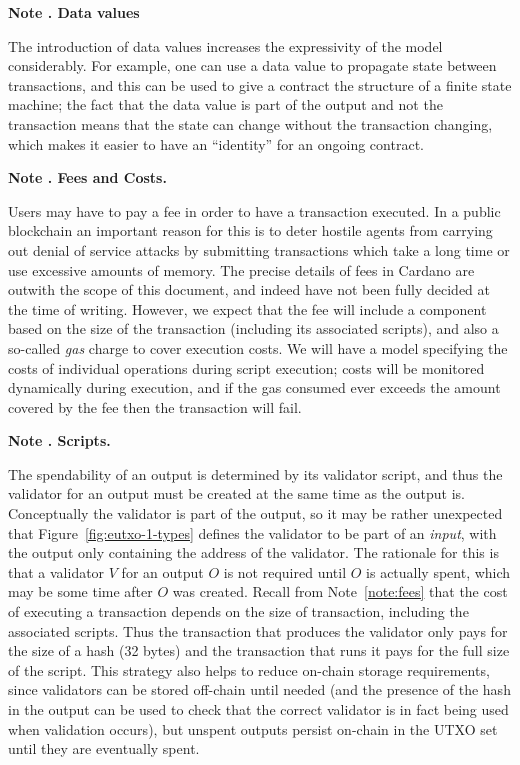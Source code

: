 \documentclass[a4paper]{article}
\newcounter{note}
\newcommand{\note}[1]{
  \bigskip
  \refstepcounter{note}
  \noindent\textbf{Note \thenote. #1}
}
\begin{document}
\note{Data values}
\label{note:data-values}
The introduction of data values
increases the expressivity of the model considerably. For example,
one can use a data value to propagate state between
transactions, and this can be used to give a contract the structure
of a finite state machine; the fact that the data value is part
of the output and not the transaction means that the state can
change without the transaction changing, which makes it easier to
have an ``identity'' for an ongoing contract.

\note{Fees and Costs.}
\label{note:fees}
Users may have to pay a fee in order to have a transaction executed.
In a public blockchain an important reason for this is to deter
hostile agents from carrying out denial of service attacks by
submitting transactions which take a long time or use excessive
amounts of memory.  The precise details of fees in Cardano are outwith
the scope of this document, and indeed have not been fully decided at
the time of writing. However, we expect that the fee will include a
component based on the size of the transaction (including its
associated scripts), and also a so-called \textit{gas} charge to cover
execution costs.  We will have a model specifying the costs of
individual operations during script execution; costs will be monitored
dynamically during execution, and if the gas consumed ever exceeds the
amount covered by the fee then the transaction will fail.

\note{Scripts.}
\label{note:scripts} The spendability of an output is determined by
its validator script, and thus the validator for an output must be
created at the same time as the output is.  Conceptually the validator
is  part of the output, so it may be rather unexpected that
Figure~\ref{fig:eutxo-1-types} defines the validator to be part of an
\textit{input}, with the output only containing the address of the
validator.  The rationale for this is that a validator $V$ for an
output $O$ is not required until $O$ is actually spent, which may be
some time after $O$ was created.  Recall from Note~\ref{note:fees} that the
cost of executing a transaction depends on the size of transaction,
including the associated scripts.  Thus the transaction that produces
the validator only pays for the size of a hash (32 bytes) and the
transaction that runs it pays for the full size of the script. This
strategy also helps to reduce on-chain storage requirements, since
validators can be stored off-chain until needed (and the presence of
the hash in the output can be used to check that the correct validator
is in fact being used when validation occurs), but unspent outputs
persist on-chain in the UTXO set until they are eventually spent.
\end{document}
